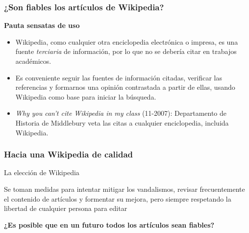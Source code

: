 \begin{frame}
\frametitle{¿Son fiables los artículos de Wikipedia?}

\textbf{Pauta sensatas de uso}
    \begin{itemize}

     \item Wikipedia, como cualquier otra enciclopedia electrónica o impresa, es
una fuente \textit{terciaria} de información, por lo que no se debería citar en
trabajos académicos.

     \item Es conveniente seguir las fuentes de información citadas, verificar
las referencias y formarnos una opinión contrastada a partir de ellas, usando Wikipedia
como base para iniciar la búsqueda.

     \item \textit{Why you can't cite Wikipedia in my class} (11-2007): Departamento de Historia
de Middlebury veta las citas a cualquier enciclopedia, incluida Wikipedia.
    \end{itemize}

\end{frame}


\begin{frame}
\frametitle{Hacia una Wikipedia de calidad}

\Large{La elección de Wikipedia}
\bigskip

\normalsize{Se toman medidas para intentar mitigar los vandalismos, revisar
frecuentemente el contenido de artículos y formentar su mejora, pero siempre
respetando la libertad de cualquier persona para editar}

\bigskip
\Large{\textbf{¿Es posible que en un futuro todos los artículos sean fiables?}}

\end{frame}

